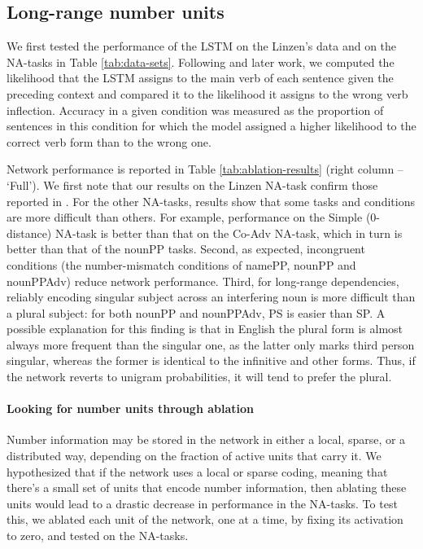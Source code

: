 \subsection{Long-range number units}\label{subsec:ablation}
We first tested the performance of the LSTM on the Linzen's data and on the NA-tasks in Table
\ref{tab:data-sets}. Following
 and later work, we computed the likelihood
that the LSTM assigns to the main verb of each sentence given the
preceding context and compared it to the likelihood it assigns to the
wrong verb inflection. Accuracy in a given condition was measured as the proportion of sentences in this condition for which the model assigned a higher likelihood to the correct verb form than to the wrong one.

Network performance is reported in Table \ref{tab:ablation-results}
(right column -- `Full'). We first note that our results on the Linzen NA-task confirm those reported in . For the other NA-tasks, results show that some tasks and
conditions are more difficult than others. For example, performance on
the Simple (0-distance) NA-task is better than that on the Co-Adv
NA-task, which in turn is better than that of the nounPP
tasks. Second, as expected, incongruent conditions (the
number-mismatch conditions of namePP, nounPP and nounPPAdv) reduce
network performance. Third, for long-range dependencies, reliably
encoding singular subject across an interfering noun is more difficult
than a plural subject: for both nounPP and nounPPAdv, PS is easier
than SP. A possible explanation for this finding is that in English the plural form is
almost always more frequent than the singular one, as the latter only
marks third person singular, whereas the former is identical to the
infinitive and other forms. Thus, if the network reverts to unigram
probabilities, it will tend to prefer the plural. 

\paragraph{Looking for number units through ablation} Number
information may be stored in the network in either a local, sparse, or
a distributed way, depending on the fraction of active units that
carry it.  We hypothesized that if the network uses a local or sparse
coding, meaning that there's a small set of units that encode number
information, then ablating these units would lead to a drastic
decrease in performance in the NA-tasks.  To test this, we ablated
each unit of the network, one at a time, by fixing its activation to zero,
and tested on the NA-tasks.

